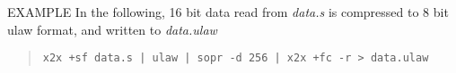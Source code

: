 \begin{options}
\end{options}

\begin{qsection}{EXAMPLE}
In the following, 16 bit data read from {\em data.s}
is compressed to 8 bit ulaw format, and written to {\em data.ulaw}
\begin{quote}
  \verb!x2x +sf data.s | ulaw | sopr -d 256 | x2x +fc -r > data.ulaw!
\end{quote}
\end{qsection}

